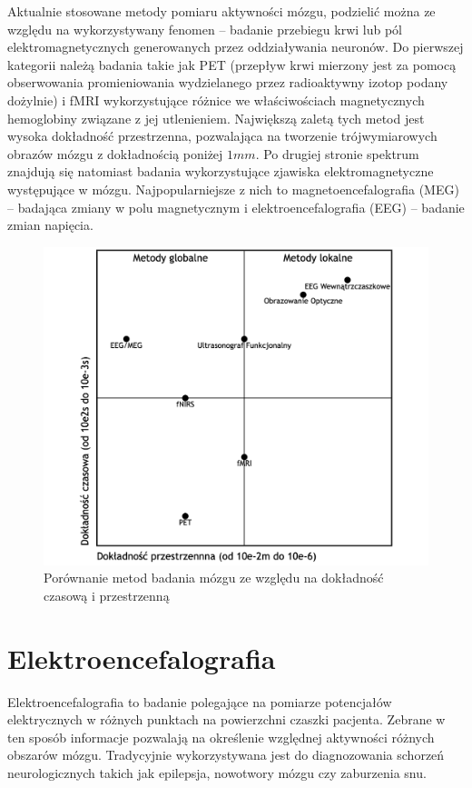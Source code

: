 \documentclass{./assets/wfis}
\begin{document}
Aktualnie stosowane metody pomiaru aktywności mózgu, podzielić można ze względu na wykorzystywany fenomen – badanie przebiegu krwi lub pól elektromagnetycznych generowanych przez oddziaływania neuronów. Do pierwszej kategorii należą badania takie jak PET (przepływ krwi mierzony jest za pomocą obserwowania promieniowania wydzielanego przez radioaktywny izotop podany dożylnie) i fMRI wykorzystujące różnice we właściwościach magnetycznych hemoglobiny związane z jej utlenieniem. Największą zaletą tych metod jest wysoka dokładność przestrzenna, pozwalająca na tworzenie trójwymiarowych obrazów mózgu z dokładnością poniżej $1mm$. Po drugiej stronie  spektrum znajdują się natomiast badania wykorzystujące zjawiska elektromagnetyczne występujące w mózgu. Najpopularniejsze z nich to magnetoencefalografia (MEG) – badająca zmiany w polu magnetycznym i elektroencefalografia (EEG) – badanie zmian napięcia. 

\begin{figure}[h]
    \centering
    \includegraphics[width=0.5\columnwidth]{assets/brain_imaging_comparasion.png}
    \caption{Porównanie metod badania mózgu ze względu na dokładność czasową i przestrzenną}
    \label{fig:brain-imaging-comparasion}
\end{figure}

\section{Elektroencefalografia}
Elektroencefalografia to badanie polegające na pomiarze potencjałów elektrycznych w różnych punktach na powierzchni czaszki pacjenta. Zebrane w ten sposób informacje pozwalają na określenie względnej aktywności różnych obszarów mózgu. Tradycyjnie wykorzystywana jest do diagnozowania schorzeń neurologicznych takich jak epilepsja, nowotwory mózgu czy zaburzenia snu.
\end{document}
